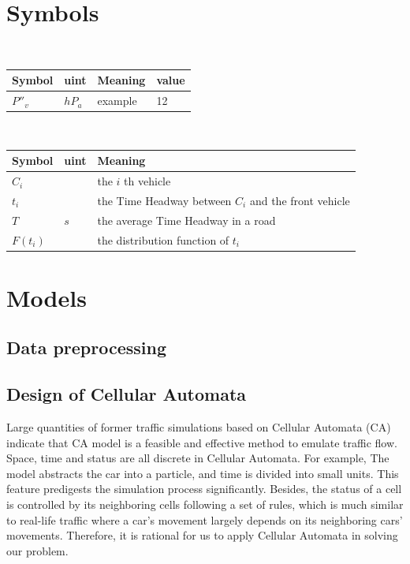 \documentclass{mcmthesis}
\begin{document}
\section{Symbols}
\begin{table}[H]
        \setlength{\abovecaptionskip}{0pt}
        \setlength{\belowcaptionskip}{0pt}
				\\
        \begin{tabular}{p{2cm}|p{2cm}|p{7.5cm}|p{1.7cm}}
		\hline
		\rowcolor[gray]{0.9}\bf{Symbol}	&\bf{uint}      &\bf{Meaning}&\bf{value}	\\
		\hline
		${P}''_{v}$		& $hP_{a}$		 & example  &12\\

		\hline
	\end{tabular}
\end{table}

\begin{table}[H]
        \setlength{\abovecaptionskip}{0pt}
        \setlength{\belowcaptionskip}{0pt}
         \\
        \begin{tabular}{p{1.8cm}|p{2.2cm}|p{9cm}}
        \hline
        \rowcolor[gray]{0.9}\bf{Symbol}	&\bf{uint}      &\bf{Meaning}\\
        \hline
        $C_{i}$	&$ $ &the $i$ th vehicle\\
        $t_{i}$	&$ $ &the Time Headway between $ C_{i} $ and the front vehicle\\
        $T$	&$s$ &the average Time Headway in a road\\
        $F(t_{i})$	&$ $ &the distribution function of $t_{i}$
\\
        
        \end{tabular}
        \end{table}

\section{Models}
\subsection{Data preprocessing}

\subsection{Design of Cellular Automata }
Large quantities of former traffic simulations based on Cellular Automata (CA) indicate that CA model is a feasible and effective method to emulate traffic flow. Space, time and status are all discrete in Cellular Automata. For example, The model abstracts the car into a particle, and time is divided into small units. This feature predigests the simulation process significantly. Besides, the status of a cell is controlled by its neighboring cells following a set of rules, which is much similar to real-life traffic where a car's movement largely depends on its neighboring cars' movements. Therefore, it is rational for us to apply Cellular Automata in solving our problem.
\\
\end{document}
